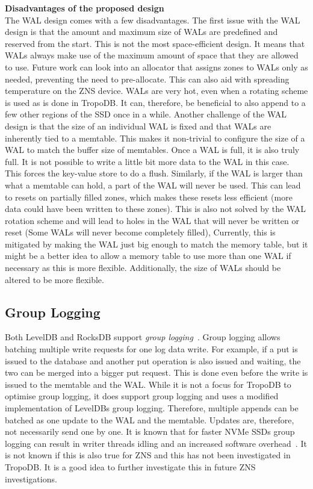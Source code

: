 \textbf{Disadvantages of the proposed design}\\
The WAL design comes with a few disadvantages. The first issue with the WAL design is that the amount and maximum size of WALs are predefined and reserved from the start. This is not the most space-efficient design. It means that WALs always make use of the maximum amount of space that they are allowed to use. Future work can look into an allocator that assigns zones to WALs only as needed, preventing the need to pre-allocate. This can also aid with spreading temperature on the ZNS device. WALs are very hot, even when a rotating scheme is used as is done in TropoDB. It can, therefore, be beneficial to also append to a few other regions of the SSD once in a while. Another challenge of the WAL design is that the size of an individual WAL is fixed and that WALs are inherently tied to a memtable. This makes it non-trivial to configure the size of a WAL to match the buffer size of memtables. Once a WAL is full, it is also truly full. It is not possible to write a little bit more data to the WAL in this case. This forces the key-value store to do a flush. Similarly, if the WAL is larger than what a memtable can hold, a part of the WAL will never be used. This can lead to resets on partially filled zones, which makes these resets less efficient (more data could have been written to these zones). This is also not solved by the WAL rotation scheme and will lead to holes in the WAL that will never be written or reset (Some WALs will never become completely filled), Currently, this is mitigated by making the WAL just big enough to match the memory table, but it might be a better idea to allow a memory table to use more than one WAL if necessary as this is more flexible. Additionally, the size of WALs should be altered to be more flexible.

\subsection{Group Logging}
\label{sec:desgrouplog}
Both LevelDB and RocksDB support \textit{group logging}~\cite{chen2021spandb}. Group logging allows batching multiple write requests for one log data write. For example, if a put is issued to the database and another put operation is also issued and waiting, the two can be merged into a bigger put request. This is done even before the write is issued to the memtable and the WAL. While it is not a focus for TropoDB to optimise group logging, it does support group logging and uses a modified implementation of LevelDBs group logging. Therefore, multiple appends can be batched as one update to the WAL and the memtable. Updates are, therefore, not necessarily send one by one. It is known that for faster NVMe SSDs group logging can result in writer threads idling and an increased software overhead~\cite{chen2021spandb}. It is not known if this is also true for ZNS and this has not been investigated in TropoDB. It is a good idea to further investigate this in future ZNS investigations.

